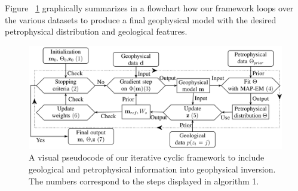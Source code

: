 \documentclass[extra]{gji} %
\begin{document}
Figure ~\ref{Flowchart} graphically summarizes in a flowchart how our framework loops over the various datasets to produce a final geophysical model with the desired petrophysical distribution and geological features.

\begin{figure}
    \includegraphics[width=\columnwidth]{./Fig/LowRes/Flowchart.png}
    \caption{A visual pseudocode of our iterative cyclic framework to include geological and petrophysical information into geophysical inversion. The numbers correspond to the steps displayed in algorithm 1.}
    \label{Flowchart}
\end{figure}

\label{lastpage}
\end{document}
